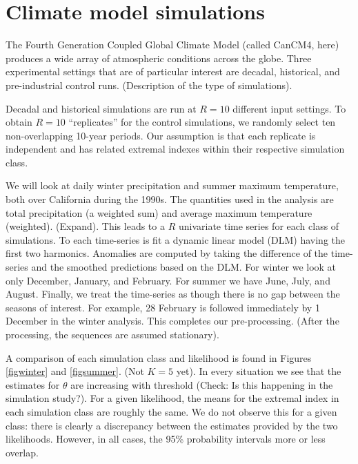 \section{Climate model simulations}
\label{climate}

The Fourth Generation Coupled Global Climate Model (called CanCM4, here) produces a wide array of atmospheric conditions across the globe. Three experimental settings that are of particular interest are decadal, historical, and pre-industrial control runs. (Description of the type of simulations).

Decadal and historical simulations are run at $R=10$ different input settings. To obtain $R=10$ ``replicates'' for the control simulations, we randomly select ten non-overlapping 10-year periods. Our assumption is that each replicate is independent and has related extremal indexes within their respective simulation class.

We will look at daily winter precipitation and summer maximum temperature, both over California during the 1990s. The quantities used in the analysis are total precipitation (a weighted sum) and average maximum temperature (weighted). (Expand). This leads to a $R$ univariate time series for each class of simulations. To each time-series is fit a dynamic linear model (DLM) having the first two harmonics. Anomalies are computed by taking the difference of the time-series and the smoothed predictions based on the DLM. For winter we look at only December, January, and February. For summer we have June, July, and August. Finally, we treat the time-series as though there is no gap between the seasons of interest. For example, 28 February is followed immediately by 1 December in the winter analysis. This completes our pre-processing. (After the processing, the sequences are assumed stationary).

A comparison of each simulation class and likelihood is found in Figures \ref{figwinter} and \ref{figsummer}. (Not $K=5$ yet). In every situation we see that the estimates for $\theta$ are increasing with threshold (Check: Is this happening in the simulation study?). For a given likelihood, the means for the extremal index in each simulation class are roughly the same. We do not observe this for a given class: there is clearly a discrepancy between the estimates provided by the two likelihoods. However, in all cases, the 95\% probability intervals more or less overlap.


